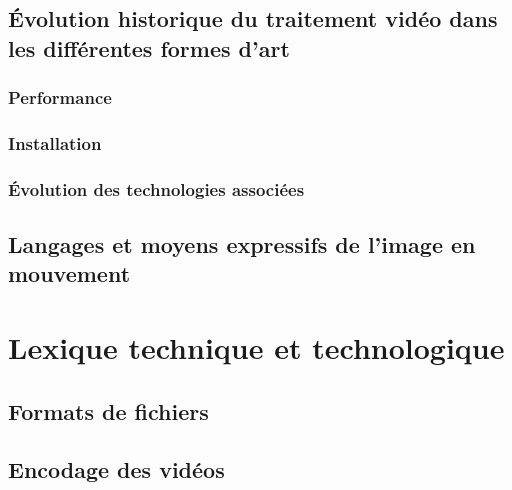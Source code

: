 \documentclass[
]{book}
\begin{document}
\hypertarget{uxe9volution-historique-du-traitement-viduxe9o-dans-les-diffuxe9rentes-formes-dart}{%
\section{Évolution historique du traitement vidéo dans les différentes formes d'art}\label{uxe9volution-historique-du-traitement-viduxe9o-dans-les-diffuxe9rentes-formes-dart}}

\hypertarget{performance}{%
\subsection{Performance}\label{performance}}

\hypertarget{installation}{%
\subsection{Installation}\label{installation}}

\hypertarget{uxe9volution-des-technologies-associuxe9es}{%
\subsection{Évolution des technologies associées}\label{uxe9volution-des-technologies-associuxe9es}}

\hypertarget{langages-et-moyens-expressifs-de-limage-en-mouvement}{%
\section{Langages et moyens expressifs de l'image en mouvement}\label{langages-et-moyens-expressifs-de-limage-en-mouvement}}

\hypertarget{lexique}{%
\chapter{Lexique technique et technologique}\label{lexique}}

\hypertarget{formats-de-fichiers}{%
\section{Formats de fichiers}\label{formats-de-fichiers}}

\hypertarget{encodage-des-viduxe9os}{%
\section{Encodage des vidéos}\label{encodage-des-viduxe9os}}
\end{document}

